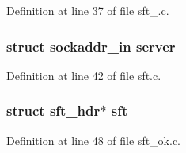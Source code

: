 Definition at line 37 of file sft\_\-.c.

\hypertarget{group__tools_ga437cecc27162b023659813375ca67d62}{
\subsubsection[{server}]{\setlength{\rightskip}{0pt plus 5cm}struct sockaddr\_\-in {\bf server}}}
\label{group__tools_ga437cecc27162b023659813375ca67d62}


Definition at line 42 of file sft.c.

\hypertarget{group__tools_ga4f4956a7fff1361d70eee8e88bb4f7f4}{
\subsubsection[{sft}]{\setlength{\rightskip}{0pt plus 5cm}struct {\bf sft\_\-hdr}$\ast$ {\bf sft}}}
\label{group__tools_ga4f4956a7fff1361d70eee8e88bb4f7f4}


Definition at line 48 of file sft\_\-ok.c.

